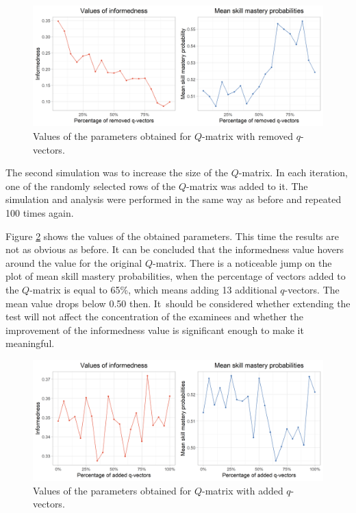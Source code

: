 \documentclass[english]{pwr_wmat_praca_dyplomowa}
\theoremstyle{plain}
\numberwithin{theorem}{chapter}
\theoremstyle{definition}
\numberwithin{theorem}{chapter}
\begin{document}
	\begin{figure}[h!]
		\centering
		\includegraphics[width=\textwidth]{Smaller_qmatrix_results2.png}
		\caption{Values of the parameters obtained for $Q$-matrix with removed $q$-vectors.}
		\label{smaller_qmat}
	\end{figure}
	
	The second simulation was to increase the size of the $Q$-matrix. In each iteration, one of the randomly selected rows of the $Q$-matrix was added to it. The simulation and analysis were performed in the same way as before and repeated 100 times again. 
	
	Figure \ref{bigger_qmat} shows the values of the obtained parameters. This time the results are not as obvious as before. It can be concluded that the informedness value hovers around the value for the original $Q$-matrix. There is a noticeable jump on the plot of mean skill mastery probabilities, when the percentage of vectors added to the $Q$-matrix is equal to 65\%, which means adding 13 additional $q$-vectors. The mean value drops below 0.50 then. It~should be considered whether extending the test will not affect the concentration of the examinees and whether the improvement of the informedness value is significant enough to make it meaningful.
	
	\begin{figure}[H]
		\centering
		\includegraphics[width=\textwidth]{Bigger_qmatrix_results2.png}
		\caption{Values of the parameters obtained for $Q$-matrix with added $q$-vectors.}
		\label{bigger_qmat}
	\end{figure}
	
\end{document}
